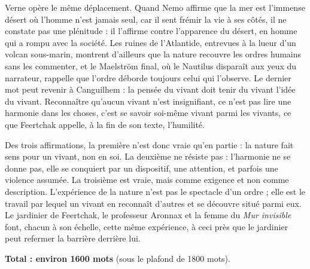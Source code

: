 \documentclass[11pt,a4paper]{article}
\begin{document}
Verne opère le même déplacement. Quand Nemo affirme que la mer est l'immense désert où l'homme n'est jamais seul, car il sent frémir la vie à ses côtés, il ne constate pas une plénitude : il l'affirme contre l'apparence du désert, en homme qui a rompu avec la société. Les ruines de l'Atlantide, entrevues à la lueur d'un volcan sous-marin, montrent d'ailleurs que la nature recouvre les ordres humains sans les commenter, et le Maelström final, où le Nautilus disparaît aux yeux du narrateur, rappelle que l'ordre déborde toujours celui qui l'observe. Le dernier mot peut revenir à Canguilhem : la pensée du vivant doit tenir du vivant l'idée du vivant. Reconnaître qu'aucun vivant n'est insignifiant, ce n'est pas lire une harmonie dans les choses, c'est se savoir soi-même vivant parmi les vivants, ce que Feertchak appelle, à la fin de son texte, l'humilité.

Des trois affirmations, la première n'est donc vraie qu'en partie : la nature fait sens pour un vivant, non en soi. La deuxième ne résiste pas : l'harmonie ne se donne pas, elle se conquiert par un dispositif, une attention, et parfois une violence assumée. La troisième est vraie, mais comme exigence et non comme description. L'expérience de la nature n'est pas le spectacle d'un ordre ; elle est le travail par lequel un vivant en reconnaît d'autres et se découvre situé parmi eux. Le jardinier de Feertchak, le professeur Aronnax et la femme du \emph{Mur invisible} font, chacun à son échelle, cette même expérience, à ceci près que le jardinier peut refermer la barrière derrière lui.

\textbf{Total : environ 1600 mots} (sous le plafond de 1800 mots).
\end{document}
